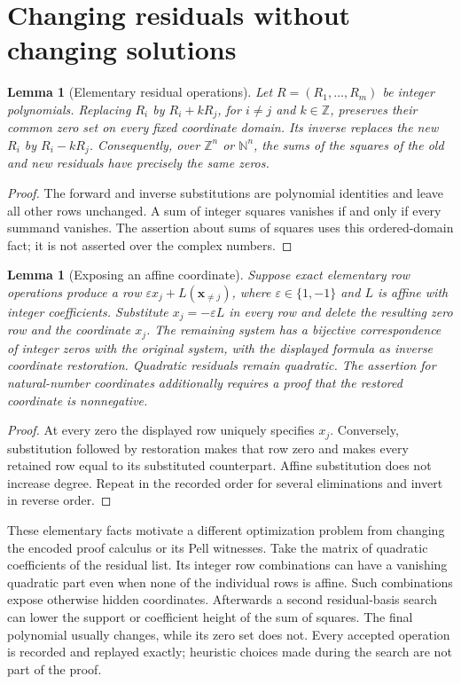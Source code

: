 \documentclass[11pt]{article}
\newtheorem{lemma}[theorem]{Lemma}
\theoremstyle{definition}\newtheorem{definition}[theorem]{Definition}
\theoremstyle{remark}\newtheorem{remark}[theorem]{Remark}
\newcommand{\Z}{\mathbb Z}\newcommand{\N}{\mathbb N}
\begin{document}

\section{Changing residuals without changing solutions}
\begin{lemma}[Elementary residual operations]
Let $R=(R_1,\ldots,R_m)$ be integer polynomials. Replacing $R_i$ by
$R_i+kR_j$, for $i\ne j$ and $k\in\Z$, preserves their common zero set
on every fixed coordinate domain. Its inverse replaces the new $R_i$
by $R_i-kR_j$. Consequently, over $\Z^n$ or $\N^n$, the sums of the
squares of the old and new residuals have precisely the same zeros.
\end{lemma}
\begin{proof}
The forward and inverse substitutions are polynomial identities and
leave all other rows unchanged. A sum of integer squares vanishes if
and only if every summand vanishes. The assertion about sums of squares
uses this ordered-domain fact; it is not asserted over the complex numbers.
\end{proof}

\begin{lemma}[Exposing an affine coordinate]
Suppose exact elementary row operations produce a row
$\varepsilon x_j+L(\boldsymbol{x}_{\ne j})$, where
$\varepsilon\in\{1,-1\}$ and $L$ is affine with integer coefficients.
Substitute $x_j=-\varepsilon L$ in every row and delete the resulting
zero row and the coordinate $x_j$. The remaining system has a bijective
correspondence of integer zeros with the original system, with the displayed
formula as inverse coordinate restoration. Quadratic residuals remain
quadratic. The assertion for natural-number coordinates additionally
requires a proof that the restored coordinate is nonnegative.
\end{lemma}
\begin{proof}
At every zero the displayed row uniquely specifies $x_j$. Conversely,
substitution followed by restoration makes that row zero and makes
every retained row equal to its substituted counterpart. Affine
substitution does not increase degree. Repeat in the recorded order
for several eliminations and invert in reverse order.
\end{proof}

These elementary facts motivate a different optimization problem from
changing the encoded proof calculus or its Pell witnesses. Take the matrix
of quadratic coefficients of the residual list. Its integer row
combinations can have a vanishing quadratic part even when none of the
individual rows is affine. Such combinations expose otherwise hidden
coordinates. Afterwards a second residual-basis search can lower the
support or coefficient height of the sum of squares. The final polynomial
usually changes, while its zero set does not. Every accepted operation is
recorded and replayed exactly; heuristic choices made during the search
are not part of the proof.
\end{document}
